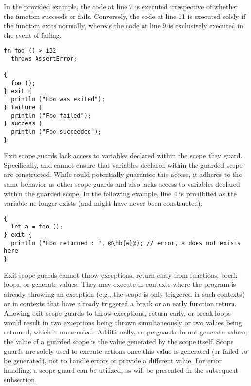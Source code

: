 \smallskip

In the provided example, the code at line 7 is executed irrespective of whether
the  function succeeds or fails. Conversely, the code at line 11 is
executed solely if the  function exits normally, whereas the code at
line 9 is exclusively executed in the event of  failing.

\begin{lstlisting}[style=coloredverbatim]
fn foo ()-> i32
  throws AssertError;

{
  foo ();
} exit {
  println ("Foo was exited");
} failure {
  println ("Foo failed");
} success {
  println ("Foo succeeded");
}
\end{lstlisting}

Exit scope guards lack access to variables declared within the scope they guard.
Specifically,  and  cannot ensure that variables
declared within the guarded scope are constructed. While  could
potentially guarantee this access, it adheres to the same behavior as other
scope guards and also lacks access to variables declared within the guarded
scope. In the following example, line 4 is prohibited as the variable 
no longer exists (and might have never been constructed).

\begin{lstlisting}[style=coloredverbatim, escapechar=@]
{
  let a = foo ();
} exit {
  println ("Foo returned : ", @\hb{a}@); // error, a does not exists here
}
\end{lstlisting}

Exit scope guards cannot throw exceptions, return early from functions, break
loops, or generate values. They may execute in contexts where the program is
already throwing an exception (e.g., the  scope is only triggered
in such contexts) or in contexts that have already triggered a break or an early
function return. Allowing exit scope guards to throw exceptions, return early,
or break loops would result in two exceptions being thrown simultaneously or two
values being returned, which is nonsensical. Additionally, scope guards do not
generate values; the value of a guarded scope is the value generated by the
scope itself. Scope guards are solely used to execute actions once this value is
generated (or failed to be generated), not to handle errors or provide a
different value. For error handling, a  scope guard can be
utilized, as will be presented in the subsequent subsection.

